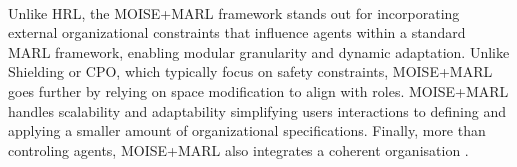 \documentclass[sigconf,anonymous]{aamas}
\begin{document}
%

\

Unlike HRL, the MOISE+MARL framework stands out for incorporating external organizational constraints that influence agents within a standard MARL framework, enabling modular granularity and dynamic adaptation. Unlike Shielding or CPO, which typically focus on safety constraints, MOISE+MARL goes further by relying on space modification to align with roles. MOISE+MARL handles scalability and adaptability simplifying users interactions to defining and applying a smaller amount of organizational specifications. Finally, more than controling agents, MOISE+MARL also integrates a coherent organisation .
\end{document}
